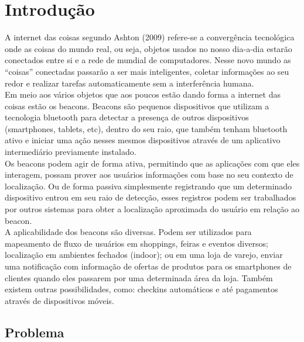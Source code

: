 \chapter{Introdução}
\label{cap:introducao}

A internet das coisas segundo Ashton (2009) refere-se a convergência tecnológica onde as coisas do mundo real, ou seja, objetos usados no nosso dia-a-dia estarão conectados entre si e a rede de mundial de computadores. Nesse novo mundo as “coisas” conectadas passarão a ser mais inteligentes, coletar informações ao seu redor e realizar tarefas automaticamente sem a interferência humana. \\
\indent Em meio aos vários objetos que aos poucos estão dando forma a internet das coisas estão os beacons. Beacons são pequenos dispositivos que utilizam a tecnologia bluetooth para detectar a presença de outros dispositivos (smartphones, tablets, etc), dentro do seu raio, que também tenham bluetooth ativo e iniciar uma ação nesses mesmos dispositivos através de um aplicativo intermediário previamente instalado. \\
\indent Os beacons podem agir de forma ativa, permitindo que as aplicações com que eles interagem, possam prover aos usuários informações com base no seu contexto de localização. Ou de forma passiva simplesmente registrando que um determinado dispositivo entrou em seu raio de detecção, esses registros podem ser trabalhados por outros sistemas para obter a localização aproximada do usuário em relação ao beacon. \\
\indent A aplicabilidade dos beacons são diversas. Podem ser utilizados para mapeamento de fluxo de usuários em shoppings, feiras e eventos diversos; localização em ambientes fechados (indoor); ou em uma loja de varejo, enviar uma notificação com informação de ofertas de produtos para os smartphones de clientes quando eles passarem por uma determinada área da loja. Também existem outras possibilidades, como: checkins automáticos e até pagamentos através de dispositivos móveis.



\section{Problema}
\label{sec:problema}

